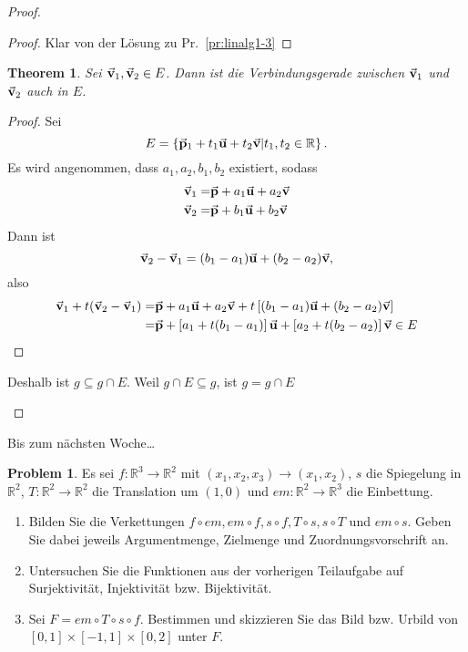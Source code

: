 \documentclass[prb,12pt]{revtex4-2}
\newtheorem{Theorem}{Theorem}
\theoremstyle{definition}
\newtheorem{Problem}{Problem}
\theoremstyle{definition}
\newenvironment{parts}{\begin{enumerate}[label=(\alph*)]}{\end{enumerate}}
\newcommand{\R}{\mathbb{R}}
\begin{document}
\begin{proof}
\begin{parts}
		\begin{proof}
			Klar von der Lösung zu Pr.~\ref{pr:linalg1-3}
		\end{proof}
		\begin{Theorem}
			Sei $\va v_1, \va v_2\in E$. Dann ist die Verbindungsgerade zwischen $\va v_1$ und $\va v_2$ auch in $E$.
		\end{Theorem}
		\begin{proof}
			Sei
			\[
			E=\left\{ \va p_1+t_1\va u+t_2\va v|t_1,t_2\in \R \right\} 
			.\] 
			Es wird angenommen, dass $a_1,a_2,b_1,b_2$ existiert, sodass
			\begin{align*}
				\va v_1=& \va p+a_1\va u+a_2\va v\\
				\va v_2=&\va p+b_1\va u+b_2\va v
			\end{align*}
			Dann ist
			\[
			\va v_2-\va v_1=(b_1-a_1)\va u+(b_2-a_2)\va v,\]
			also
			\begin{align*}
				\va v_1+t(\va v_2-\va v_1)=& \va p+a_1\va u+a_2\va v+t\left[ (b_1-a_1)\va u+(b_2-a_2)\va v \right]\\
				=& \va p+\left[ a_1+t(b_1-a_1) \right] \va u+\left[ a_2+t(b_2-a_2) \right] \va v\in E
			\end{align*}
		\end{proof}

		Deshalb ist $g\subseteq g\cap E$. Weil $g\cap E\subseteq g$, ist $g=g\cap E$
	\end{parts}
\end{proof}
\newpage
Bis zum nächsten Woche\ldots
\begin{Problem}
Es sei $f: \R^3\to \R^2$ mit $(x_1, x_2, x_3) \to (x_1, x_2)$, $s$ die Spiegelung in $\R^2$, $T : \R^2 \to \R^2$ die Translation um $(1, 0)$ und $em : \R^2 \to \R^3$ die Einbettung.
\begin{parts}
\item 	Bilden Sie die Verkettungen $f \circ em, em \circ f , s \circ f , T \circ s, s \circ T$ und $em \circ s$. Geben Sie dabei jeweils Argumentmenge, Zielmenge und Zuordnungsvorschrift an.
\item  Untersuchen Sie die Funktionen aus der vorherigen Teilaufgabe auf Surjektivit\"{a}t, Injektivit\"{a}t bzw. Bijektivit\"{a}t.
\item  Sei $F = em\circ T \circ s\circ f$. Bestimmen und skizzieren Sie das Bild bzw. Urbild von $[0,1]\times [-1,1]\times [0,2]$ unter  $F$.
\end{parts}
\end{Problem}
\end{document}
